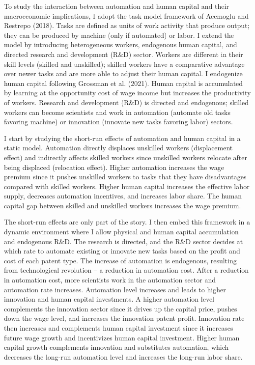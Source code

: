 \documentclass[12pt]{article}
\begin{document}
To study the interaction between automation and human capital and their macroeconomic implications, I adopt the task model framework of Acemoglu and Restrepo (2018)\nocite{AcemogluRestrepo2018}. Tasks are defined as units of work activity that produce output; they can be produced by machine (only if automated) or labor. I extend the model by introducing heterogeneous workers, endogenous human capital, and directed research and development (R\&D) sector. Workers are different in their skill levels (skilled and unskilled); skilled workers have a comparative advantage over newer tasks and are more able to adjust their human capital. I endogenize human capital following Grossman et al. (2021)\nocite{Grossmanetal2021}. Human capital is accumulated by learning at the opportunity cost of wage income but increases the productivity of workers. Research and development (R\&D) is directed and endogenous; skilled workers can become scientists and work in automation (automate old tasks favoring machine) or innovation (innovate new tasks favoring labor) sectors.

I start by studying the short-run effects of automation and human capital in a static model. Automation directly displaces unskilled workers (displacement effect) and indirectly affects skilled workers since unskilled workers relocate after being displaced (relocation effect). Higher automation increases the wage premium since it pushes unskilled workers to tasks that they have disadvantages compared with skilled workers. Higher human capital increases the effective labor supply, decreases automation incentives, and increases labor share. The human capital gap between skilled and unskilled workers increases the wage premium. 

The short-run effects are only part of the story. I then embed this framework in a dynamic environment where I allow physical and human capital accumulation and endogenous R\&D. The research is directed, and the R\&D sector decides at which rate to automate existing or innovate new tasks based on the profit and cost of each patent type. The increase of automation is endogenous, resulting from technological revolution -- a reduction in automation cost. After a reduction in automation cost, more scientists work in the automation sector and automation rate increases. Automation level increases and leads to higher innovation and human capital investments. A higher automation level complements the innovation sector since it drives up the capital price, pushes down the wage level, and increases the innovation patent profit. Innovation rate then increases and complements human capital investment since it increases future wage growth and incentivizes human capital investment. Higher human capital growth complements innovation and substitutes automation, which decreases the long-run automation level and increases the long-run labor share. 
\end{document}
